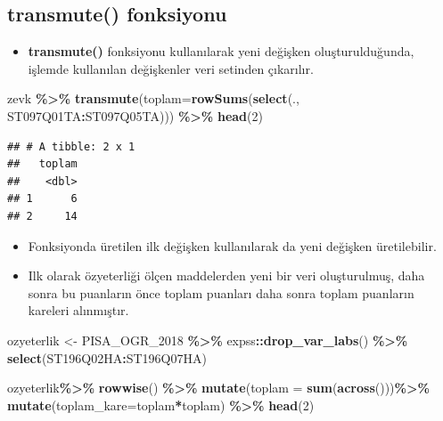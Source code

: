 \documentclass[
  oneside]{book}
\newenvironment{Shaded}{\begin{snugshade}}{\end{snugshade}}
\newcommand{\AttributeTok}[1]{\textcolor[rgb]{0.13,0.29,0.53}{#1}}
\newcommand{\DecValTok}[1]{\textcolor[rgb]{0.00,0.00,0.81}{#1}}
\newcommand{\FunctionTok}[1]{\textcolor[rgb]{0.13,0.29,0.53}{\textbf{#1}}}
\newcommand{\NormalTok}[1]{#1}
\newcommand{\OtherTok}[1]{\textcolor[rgb]{0.56,0.35,0.01}{#1}}
\newcommand{\SpecialCharTok}[1]{\textcolor[rgb]{0.81,0.36,0.00}{\textbf{#1}}}
\providecommand{\tightlist}{%
  \setlength{\itemsep}{0pt}\setlength{\parskip}{0pt}}
\begin{document}
\hypertarget{transmute-fonksiyonu}{%
\subsection{transmute() fonksiyonu}\label{transmute-fonksiyonu}}

\begin{itemize}
\tightlist
\item
  \textbf{transmute()} fonksiyonu kullanılarak yeni değişken oluşturulduğunda, işlemde kullanılan değişkenler veri setinden çıkarılır.
\end{itemize}

\begin{Shaded}
\begin{Highlighting}[]
\NormalTok{zevk }\SpecialCharTok{\%\textgreater{}\%}
\FunctionTok{transmute}\NormalTok{(}\AttributeTok{toplam=}\FunctionTok{rowSums}\NormalTok{(}\FunctionTok{select}\NormalTok{(., ST097Q01TA}\SpecialCharTok{:}\NormalTok{ST097Q05TA))) }\SpecialCharTok{\%\textgreater{}\%}
\FunctionTok{head}\NormalTok{(}\DecValTok{2}\NormalTok{)}
\end{Highlighting}
\end{Shaded}

\begin{verbatim}
## # A tibble: 2 x 1
##   toplam
##    <dbl>
## 1      6
## 2     14
\end{verbatim}

\begin{itemize}
\item
  Fonksiyonda üretilen ilk değişken kullanılarak da yeni değişken üretilebilir.
\item
  Ilk olarak özyeterliği ölçen maddelerden yeni bir veri oluşturulmuş, daha sonra bu puanların önce toplam puanları daha sonra toplam puanların kareleri alınmıştır.
\end{itemize}

\begin{Shaded}
\begin{Highlighting}[]
\NormalTok{ozyeterlik }\OtherTok{\textless{}{-}}\NormalTok{ PISA\_OGR\_2018 }\SpecialCharTok{\%\textgreater{}\%}
\NormalTok{  expss}\SpecialCharTok{::}\FunctionTok{drop\_var\_labs}\NormalTok{() }\SpecialCharTok{\%\textgreater{}\%}
  \FunctionTok{select}\NormalTok{(ST196Q02HA}\SpecialCharTok{:}\NormalTok{ST196Q07HA)}

\NormalTok{ozyeterlik}\SpecialCharTok{\%\textgreater{}\%}
  \FunctionTok{rowwise}\NormalTok{() }\SpecialCharTok{\%\textgreater{}\%}
  \FunctionTok{mutate}\NormalTok{(}\AttributeTok{toplam =} \FunctionTok{sum}\NormalTok{(}\FunctionTok{across}\NormalTok{()))}\SpecialCharTok{\%\textgreater{}\%}
  \FunctionTok{mutate}\NormalTok{(}\AttributeTok{toplam\_kare=}\NormalTok{toplam}\SpecialCharTok{*}\NormalTok{toplam) }\SpecialCharTok{\%\textgreater{}\%} \FunctionTok{head}\NormalTok{(}\DecValTok{2}\NormalTok{)}
\end{Highlighting}
\end{Shaded}
\end{document}
